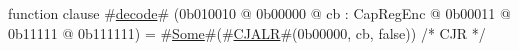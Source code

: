 function clause #\hyperref[zdecode]{decode}# (0b010010 @ 0b00000 @ cb : CapRegEnc @    0b00011 @    0b11111 @ 0b111111) = #\hyperref[zSome]{Some}#(#\hyperref[zCJALR]{CJALR}#(0b00000, cb, false)) /* CJR */
